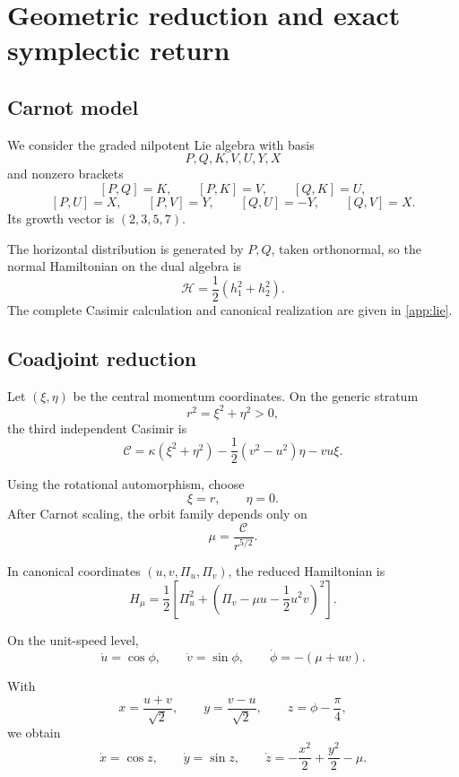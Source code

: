 \section{Geometric reduction and exact symplectic return}
\label{sec:reduction}

\subsection{Carnot model}

We consider the graded nilpotent Lie algebra with basis
\[
P,Q,K,V,U,Y,X
\]
and nonzero brackets
\[
[P,Q]=K,\qquad [P,K]=V,\qquad [Q,K]=U,
\]
\[
[P,U]=X,\qquad [P,V]=Y,\qquad [Q,U]=-Y,\qquad [Q,V]=X.
\]
Its growth vector is \((2,3,5,7)\).

The horizontal distribution is generated by \(P,Q\), taken orthonormal, so the normal Hamiltonian on the dual algebra is
\[
\mathcal H=\frac12(h_1^2+h_2^2).
\]
The complete Casimir calculation and canonical realization are given in \cref{app:lie}.

\subsection{Coadjoint reduction}

Let \((\xi,\eta)\) be the central momentum coordinates. On the generic stratum
\[
r^2=\xi^2+\eta^2>0,
\]
the third independent Casimir is
\[
\mathcal C
=
\kappa(\xi^2+\eta^2)
-\frac12(v^2-u^2)\eta
-vu\xi.
\]

Using the rotational automorphism, choose
\[
\xi=r,\qquad \eta=0.
\]
After Carnot scaling, the orbit family depends only on
\begin{equation}
\boxed{
\mu=\frac{\mathcal C}{r^{5/2}}.
}
\label{eq:mu-def}
\end{equation}

In canonical coordinates \((u,v,\Pi_u,\Pi_v)\), the reduced Hamiltonian is
\begin{equation}
\boxed{
H_\mu
=
\frac12
\left[
\Pi_u^2+
\left(
\Pi_v-\mu u-\frac12u^2v
\right)^2
\right].
}
\label{eq:reduced-H}
\end{equation}

On the unit-speed level,
\[
\dot u=\cos\phi,\qquad
\dot v=\sin\phi,\qquad
\dot\phi=-(\mu+uv).
\]

With
\[
x=\frac{u+v}{\sqrt2},\qquad
y=\frac{v-u}{\sqrt2},\qquad
z=\phi-\frac{\pi}{4},
\]
we obtain
\begin{equation}
\boxed{
\dot x=\cos z,\qquad
\dot y=\sin z,\qquad
\dot z=-\frac{x^2}{2}+\frac{y^2}{2}-\mu.
}
\label{eq:reduced-flow}
\end{equation}

